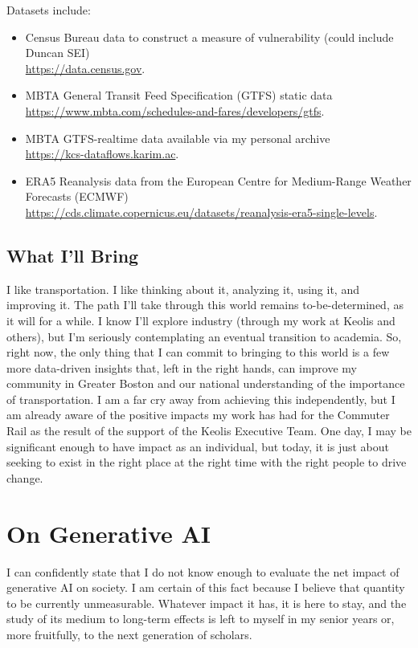 \documentclass[12pt]{article}
\begin{document}
\begin{enumerate}
    Datasets include:
    \begin{itemize}
        \item Census Bureau data to construct a measure of vulnerability (could include Duncan SEI) \\ \url{https://data.census.gov}.
        \item MBTA General Transit Feed Specification (GTFS) static data \\ \url{https://www.mbta.com/schedules-and-fares/developers/gtfs}.
        \item MBTA GTFS-realtime data available via my personal archive \\ \url{https://kcs-dataflows.karim.ac}.
        \item ERA5 Reanalysis data from the European Centre for Medium-Range Weather Forecasts (ECMWF) \\ \url{https://cds.climate.copernicus.eu/datasets/reanalysis-era5-single-levels}.
    \end{itemize}
\end{enumerate}
\subsection{What I'll Bring}
I like transportation. I like thinking about it, analyzing it, using it, and improving it.
The path I'll take through this world remains to-be-determined, as it will for a while.
I know I'll explore industry (through my work at Keolis and others), but I'm seriously contemplating an eventual transition to academia.
So, right now, the only thing that I can commit to bringing to this world is a few more data-driven insights that, left in the right hands, can improve my community in Greater Boston and our national understanding of the importance of transportation.
I am a far cry away from achieving this independently, but I am already aware of the positive impacts my work has had for the Commuter Rail as the result of the support of the Keolis Executive Team.
One day, I may be significant enough to have impact as an individual, but today, it is just about seeking to exist in the right place at the right time with the right people to drive change.
\section{On Generative AI}
I can confidently state that I do not know enough to evaluate the net impact of generative AI on society.
I am certain of this fact because I believe that quantity to be currently unmeasurable.
Whatever impact it has, it is here to stay, and the study of its medium to long-term effects is left to myself in my senior years or, more fruitfully, to the next generation of scholars.
\end{document}
